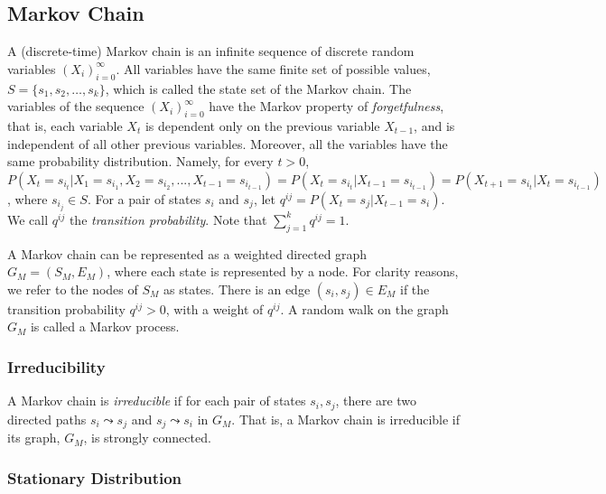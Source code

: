 \documentclass[sigconf,anonymous]{aamas}
\newcommand{\set}[1]{\{#1\}}
\begin{document}
\subsection{Markov Chain}
\label{sec:maarkov_chain}


A (discrete-time) Markov chain is %
an infinite sequence of discrete random variables $(X_i)_{i=0}^{\infty}$.
All variables have the same finite set of possible values, $S = \set{s_1,s_2,\ldots,s_k}$, which is called the state set of the Markov chain.
The variables of the sequence $(X_i)_{i=0}^{\infty}$ have the Markov property of \textit{forgetfulness}, that is, each variable $X_t$ is dependent only on the previous variable $X_{t-1}$, and is independent of all other previous variables. Moreover, all the variables have the same probability distribution.
Namely, for every $t>0$, $P(X_{t}=s_{i_t}|X_1=s_{i_1},X_2=s_{i_2},...,X_{t-1}=s_{i_{t-1}}) =P(X_{t}=s_{i_t}|X_{t-1}=s_{i_{t-1}})=P(X_{t+1}=s_{i_t}|X_{t}=s_{i_{t-1}})$, where $s_{i_j} \in S$. For a pair of states $s_i$ and $s_j$, let $q^{ij}=P(X_{t}=s_j|X_{t-1}=s_i)$. We call $q^{ij}$ the \textit{transition probability}. Note that $\sum_{j=1}^k{q^{ij}}=1$. 



A Markov chain can be represented as a weighted directed graph $G_M=(S_M,E_M)$, where each state is represented by a node. For clarity reasons, we refer to the nodes of $S_M$ as states.
There is an edge $(s_i,s_j) \in E_M$ if the transition probability $q^{ij}>0$, with a weight of $q^{ij}$.
A random walk on the graph $G_M$ is called a Markov process.

\subsubsection{Irreducibility}
A Markov chain is \textit{irreducible} if for each pair of states $s_i,s_j$, there are two directed paths $s_i \leadsto
s_j$ and  $s_j \leadsto
s_i$ in $G_M$. That is, a Markov chain is irreducible if its graph, $G_M$, is strongly connected.

\subsubsection{Stationary Distribution}
\end{document}
